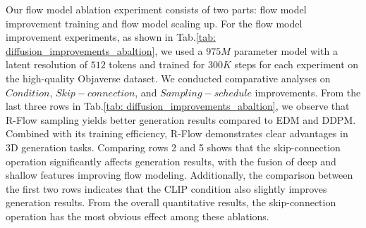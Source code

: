 Our flow model ablation experiment consists of two parts: flow model improvement training and flow model scaling up. For the flow model improvement experiments, as shown in Tab.\ref{tab: diffusion_improvements_abaltion}, we used a $975M$ parameter model with a latent resolution of $512$ tokens and trained for $300K$ steps for each experiment on the high-quality Objaverse dataset. We conducted comparative analyses on $Condition$, $Skip-connection$, and $Sampling-schedule$ improvements.
From the last three rows in Tab.\ref{tab: diffusion_improvements_abaltion}, we observe that R-Flow sampling yields better generation results compared to EDM and DDPM. Combined with its training efficiency, R-Flow demonstrates clear advantages in 3D generation tasks. Comparing rows 2 and 5 shows that the skip-connection operation significantly affects generation results, with the fusion of deep and shallow features improving flow modeling. Additionally, the comparison between the first two rows indicates that the CLIP condition also slightly improves generation results. 
From the overall quantitative results, the skip-connection operation has the most obvious effect among these ablations.

\begin{table}[t]
\begin{center}
\caption{The ablation for flow model scaling up.}
\vspace{1em}
\label{tab: diffusion_scaling_abaltion}
\begin{sc}
\end{sc}
\end{center}
\vspace{-2em}
\end{table}

